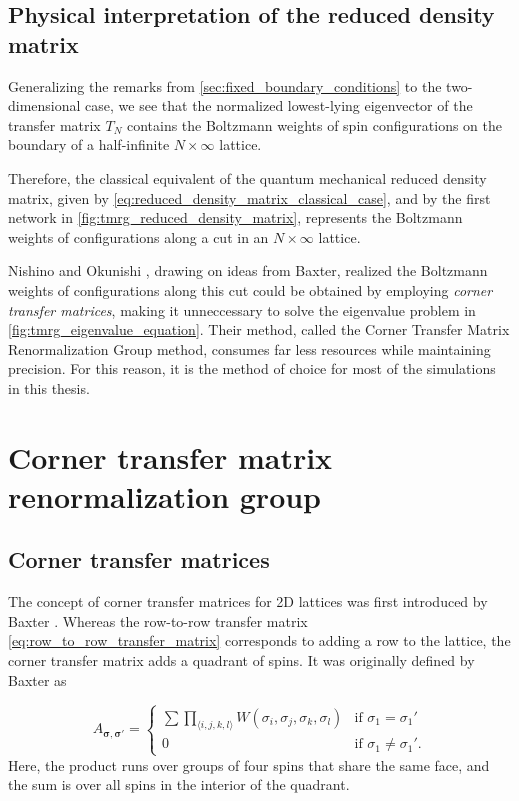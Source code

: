 \subsection{Physical interpretation of the reduced density matrix}
Generalizing the remarks from \autoref{sec:fixed_boundary_conditions} to the
two-dimensional case, we see that the normalized lowest-lying eigenvector of the transfer
matrix $T_N$ contains the Boltzmann weights of spin configurations on the boundary of a
half-infinite $N \times \infty$ lattice.

Therefore, the classical equivalent of the quantum mechanical reduced density matrix,
given by \autoref{eq:reduced_density_matrix_classical_case}, and by the first network in
\autoref{fig:tmrg_reduced_density_matrix}, represents the Boltzmann weights of
configurations along a cut in an $N \times \infty$ lattice.

Nishino and Okunishi \cite{nishino1996corner}, drawing on ideas from Baxter, realized the
Boltzmann weights of configurations along this cut could be obtained by employing
\textit{corner transfer matrices}, making it unneccessary to solve the eigenvalue problem
in \autoref{fig:tmrg_eigenvalue_equation}. Their method, called the Corner Transfer Matrix
Renormalization Group method, consumes far less resources while maintaining precision. For
this reason, it is the method of choice for most of the simulations in this thesis.


\section{Corner transfer matrix renormalization group}
\subsection{Corner transfer matrices}

The concept of corner transfer matrices for 2D lattices was first introduced by
Baxter \cite{baxter1968dimers, baxter1978variational, baxter1982exactly_ctm}.
Whereas the row-to-row transfer matrix \autoref{eq:row_to_row_transfer_matrix}
corresponds to adding a row to the lattice, the corner transfer matrix adds
a quadrant of spins. It was originally defined by Baxter as

\begin{equation}\label{eq:corner_transfer_matrix}
  A_{\bm{\sigma}, \bm{\sigma'}} =
  \begin{cases}
    \sum \prod_{\langle i, j, k, l \rangle} W(\sigma_i, \sigma_j, \sigma_k, \sigma_l) & \text{if } \sigma_{1} = \sigma_{1}' \\
    0 & \text{if } \sigma_{1} \neq \sigma_{1}'.
  \end{cases}
\end{equation}
Here, the product runs over groups of four spins that share the same face, and
the sum is over all spins in the interior of the quadrant.

